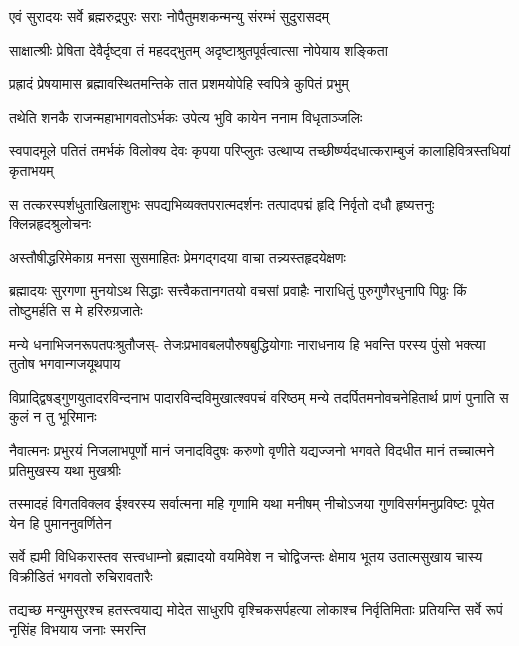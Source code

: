 

\twolineshloka
{एवं सुरादयः सर्वे ब्रह्मरुद्रपुरः सराः}
{नोपैतुमशकन्मन्यु संरम्भं सुदुरासदम्} %

\twolineshloka
{साक्षात्श्रीः प्रेषिता देवैर्दृष्ट्वा तं महदद्भुतम्}
{अदृष्टाश्रुतपूर्वत्वात्सा नोपेयाय शङ्किता} %

\twolineshloka
{प्रह्रादं प्रेषयामास ब्रह्मावस्थितमन्तिके}
{तात प्रशमयोपेहि स्वपित्रे कुपितं प्रभुम्} %

\twolineshloka
{तथेति शनकै राजन्महाभागवतोऽर्भकः}
{उपेत्य भुवि कायेन ननाम विधृताञ्जलिः} %

\twolineshloka
{स्वपादमूले पतितं तमर्भकं विलोक्य देवः कृपया परिप्लुतः}
{उत्थाप्य तच्छीर्ष्ण्यदधात्कराम्बुजं कालाहिवित्रस्तधियां कृताभयम्} %

\twolineshloka
{स तत्करस्पर्शधुताखिलाशुभः सपद्यभिव्यक्तपरात्मदर्शनः}
{तत्पादपद्मं हृदि निर्वृतो दधौ हृष्यत्तनुः क्लिन्नहृदश्रुलोचनः} %

\twolineshloka
{अस्तौषीद्धरिमेकाग्र मनसा सुसमाहितः}
{प्रेमगद्गदया वाचा तन्न्यस्तहृदयेक्षणः} %



\fourlineindentedshloka
{ब्रह्मादयः सुरगणा मुनयोऽथ सिद्धाः}
{सत्त्वैकतानगतयो वचसां प्रवाहैः}
{नाराधितुं पुरुगुणैरधुनापि पिप्रुः}
{किं तोष्टुमर्हति स मे हरिरुग्रजातेः} %

\fourlineindentedshloka
{मन्ये धनाभिजनरूपतपःश्रुतौजस्-}
{तेजःप्रभावबलपौरुषबुद्धियोगाः}
{नाराधनाय हि भवन्ति परस्य पुंसो}
{भक्त्या तुतोष भगवान्गजयूथपाय} %

\fourlineindentedshloka
{विप्राद्द्विषड्गुणयुतादरविन्दनाभ}
{पादारविन्दविमुखात्श्वपचं वरिष्ठम्}
{मन्ये तदर्पितमनोवचनेहितार्थ}
{प्राणं पुनाति स कुलं न तु भूरिमानः} %

\fourlineindentedshloka
{नैवात्मनः प्रभुरयं निजलाभपूर्णो}
{मानं जनादविदुषः करुणो वृणीते}
{यद्यज्जनो भगवते विदधीत मानं}
{तच्चात्मने प्रतिमुखस्य यथा मुखश्रीः} %

\fourlineindentedshloka
{तस्मादहं विगतविक्लव ईश्वरस्य}
{सर्वात्मना महि गृणामि यथा मनीषम्}
{नीचोऽजया गुणविसर्गमनुप्रविष्टः}
{पूयेत येन हि पुमाननुवर्णितेन} %

\fourlineindentedshloka
{सर्वे ह्यमी विधिकरास्तव सत्त्वधाम्नो}
{ब्रह्मादयो वयमिवेश न चोद्विजन्तः}
{क्षेमाय भूतय उतात्मसुखाय चास्य}
{विक्रीडितं भगवतो रुचिरावतारैः} %

\fourlineindentedshloka
{तद्यच्छ मन्युमसुरश्च हतस्त्वयाद्य}
{मोदेत साधुरपि वृश्चिकसर्पहत्या}
{लोकाश्च निर्वृतिमिताः प्रतियन्ति सर्वे}
{रूपं नृसिंह विभयाय जनाः स्मरन्ति} %

